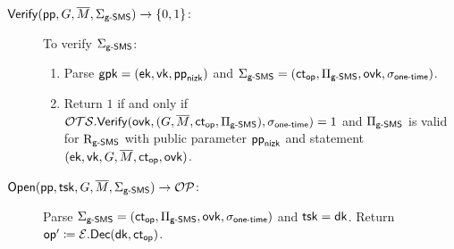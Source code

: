 \begin{description}

\item[$\SMSVerify(\pp, G, \tM, \SigmaGenericSMS) \to \{0, 1\}$:]
To verify $\SigmaGenericSMS$:
\begin{enumerate}
\item 
Parse $\gpk = (\ek, \vk, \ppnizk)$
and $\SigmaGenericSMS = (\ctop, \PiGenericSMS, \ovk, \sigmaonetime)$.
\item 
Return $1$ if and only if
$\OTSVerify(\ovk, (G, \tM, \ctop, \PiGenericSMS), \sigmaonetime) = 1$
and $\PiGenericSMS$ is valid for $\RelationGenericSMS$
with public parameter $\ppnizk$ and statement $(\ek, \vk, G, \tM, \ctop, \ovk)$.
\end{enumerate}

\item[$\SMSOpen(\pp, \tsk, G, \tM, \SigmaGenericSMS) \to \OpeningSet$:]
Parse $\SigmaGenericSMS = (\ctop, \PiGenericSMS, \ovk, \sigmaonetime)$
and $\tsk = \dk$.
Return $\op' \coloneqq \EDec(\dk, \ctop)$.

\end{description}